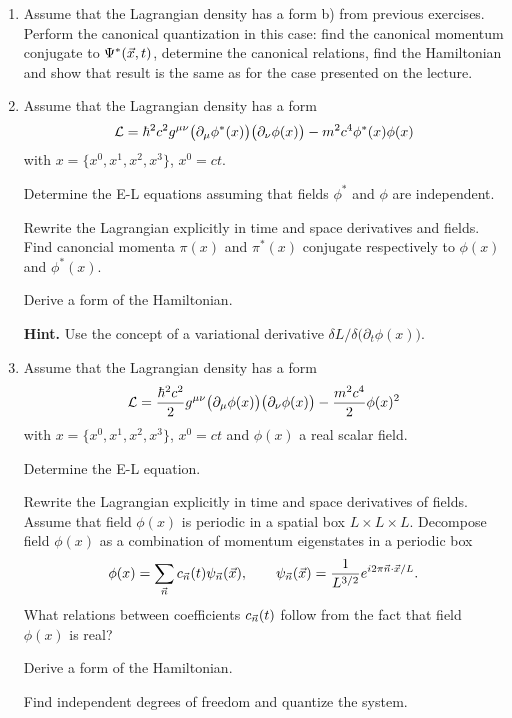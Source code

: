 \documentclass[a4paper,11pt]{article}
\begin{document}
\begin{enumerate}
\item Assume that the Lagrangian density has a form b) from previous
  exercises. Perform the canonical quantization in this case: find the
  canonical momentum conjugate to $\Psi^{ * }( \vec{x}, t )$, determine
  the canonical relations, find the Hamiltonian and show that result
  is the same as for the case presented on the lecture.



\item Assume that the Lagrangian density has a form
  \begin{equation}
    \label{eq:QM37}
    \mathcal{L} =
    \hbar^{ 2 } c^{ 2 } g^{ \mu \nu } \big( \partial_{ \mu } \phi^{ * }( x ) \big)
    \big( \partial_{ \nu } \phi( x ) \big)
    - m^{ 2 } c^{ 4 } \phi^{ * }( x ) \phi( x )
  \end{equation}
  with $x = \{ x^{ 0 }, x^{ 1 }, x^{ 2 }, x^{ 3 } \}$,
  $x^{ 0 } = c t$.

  Determine the E-L equations assuming that fields $\phi^{ * }$ and
  $\phi$ are independent.

  Rewrite the Lagrangian explicitly in time and space derivatives and
  fields. Find canoncial momenta $\pi( x )$ and $\pi^{ * }( x )$
  conjugate respectively to $\phi( x )$ and $\phi^{ * }( x )$.

  Derive a form of the Hamiltonian.

  \textbf{Hint.} Use the concept of a variational derivative
  $\delta L / \delta \big( \partial_{ t } \phi( x ) \big)$.



\item Assume that the Lagrangian density has a form
  \begin{equation}
    \label{eq:QM38}
    \mathcal{L} =
    \frac{ \hbar^{ 2 } c^{ 2 } }{ 2 } g^{ \mu \nu }
    \big( \partial_{ \mu } \phi( x ) \big) \big( \partial_{ \nu } \phi( x ) \big)
    - \frac{ m^{ 2 } c^{ 4 } }{ 2 } \phi( x )^{ 2 }
  \end{equation}
  with $x = \{ x^{ 0 }, x^{ 1 }, x^{ 2 }, x^{ 3 } \}$, $x^{ 0 } = c t$
  and $\phi( x )$ a real scalar field.

  Determine the E-L equation.

  Rewrite the Lagrangian explicitly in time and space derivatives of
  fields. Assume that field $\phi( x )$ is periodic in a spatial box
  $L \times L \times L$. Decompose field $\phi( x )$ as a combination
  of momentum eigenstates in a periodic box
  \begin{equation}
    \label{eq:QM39}
    \phi( x ) =
    \sum_{ \vec{n} } c_{ \vec{n} }( t ) \psi_{ \vec{n} }( \vec{x} ), \qquad
    \psi_{ \vec{n} }( \vec{x} ) =
    \frac{ 1 }{ L^{ 3 / 2 } } e^{ i 2\pi \vec{n} \cdot \vec{x} / L }.
  \end{equation}
  What relations between coefficients $c_{ \vec{n} }( t )$ follow from
  the fact that field $\phi( x )$ is real?

  Derive a form of the Hamiltonian.

  Find independent degrees of freedom and quantize the system.



\end{enumerate}
\end{document}
